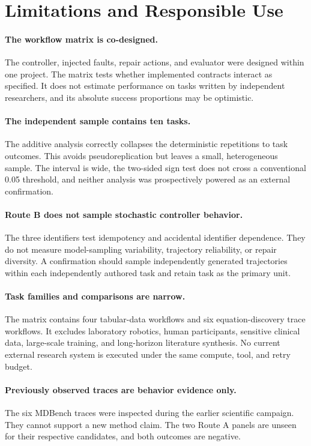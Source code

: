 \section{Limitations and Responsible Use}
\label{sec:limitations}

\paragraph{The workflow matrix is co-designed.}
The controller, injected faults, repair actions, and evaluator were designed
within one project. The matrix tests whether implemented contracts interact as
specified. It does not estimate performance on tasks written by independent
researchers, and its absolute success proportions may be optimistic.

\paragraph{The independent sample contains ten tasks.}
The additive analysis correctly collapses the deterministic repetitions to
\TaskCount{} task outcomes. This avoids pseudoreplication but leaves a small,
heterogeneous sample. The interval is wide, the two-sided sign test does not
cross a conventional 0.05 threshold, and neither analysis was prospectively
powered as an external confirmation.

\paragraph{Route B does not sample stochastic controller behavior.}
The three identifiers test idempotency and accidental identifier dependence.
They do not measure model-sampling variability, trajectory reliability, or
repair diversity. A confirmation should sample independently generated
trajectories within each independently authored task and retain task as the
primary unit.

\paragraph{Task families and comparisons are narrow.}
The matrix contains four tabular-data workflows and six equation-discovery
trace workflows. It excludes laboratory robotics, human participants,
sensitive clinical data, large-scale training, and long-horizon literature
synthesis. No current external research system is executed under the same
compute, tool, and retry budget.

\paragraph{Previously observed traces are behavior evidence only.}
The six MDBench traces were inspected during the earlier scientific campaign.
They cannot support a new method claim. The two Route A panels are unseen for
their respective candidates, and both outcomes are negative.

